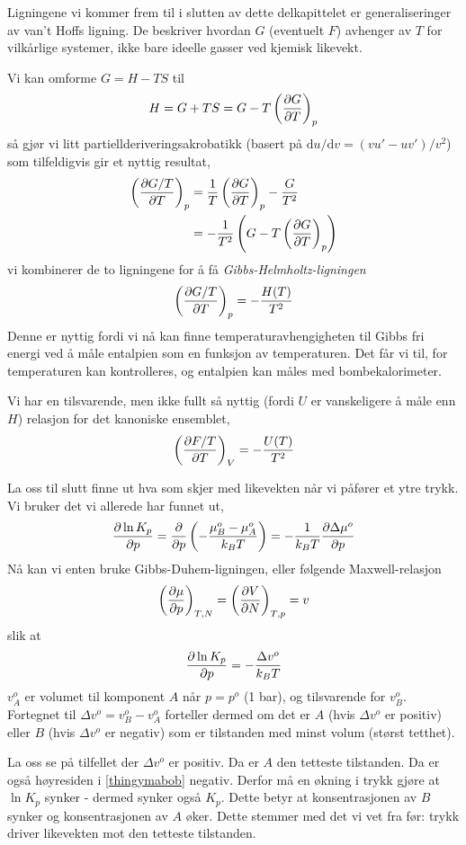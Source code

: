 Ligningene vi kommer frem til i slutten av dette delkapittelet er generaliseringer av van't Hoffs ligning. De beskriver hvordan $G$ (eventuelt $F$) avhenger av $T$ for vilkårlige systemer, ikke bare ideelle gasser ved kjemisk likevekt.

Vi kan omforme $G=H-TS$ til
\begin{equation}
	H=G+TS=G-T\left(\frac{\partial G}{\partial T}\right)_{p}
\end{equation}
så gjør vi litt partiellderiveringsakrobatikk (basert på $\text{d}u/\text{d}v=(vu'-uv')/v^2$) som tilfeldigvis gir et nyttig resultat,
\begin{align}\begin{split}
	\left(\frac{\partial G/T}{\partial T}\right)_{p}&=\frac{1}{T}\left(\frac{\partial G}{\partial T}\right)_{p}-\frac{G}{T^2}\\&=-\frac{1}{T^2}\left(G-T\left(\frac{\partial G}{\partial T}\right)_{p}\right)
\end{split}\end{align}
vi kombinerer de to ligningene for å få \emph{Gibbs-Helmholtz-ligningen}
\begin{equation}
	\left(\frac{\partial G/T}{\partial T}\right)_{p}=-\frac{H(T)}{T^2}
\end{equation}
Denne er nyttig fordi vi nå kan finne temperaturavhengigheten til Gibbs fri energi ved å måle entalpien som en funksjon av temperaturen. Det får vi til, for temperaturen kan kontrolleres, og entalpien kan måles med bombekalorimeter.

Vi har en tilsvarende, men ikke fullt så nyttig (fordi $U$ er vanskeligere å måle enn $H$) relasjon for det kanoniske ensemblet,
\begin{equation}
	\left(\frac{\partial F/T}{\partial T}\right)_{V}=-\frac{U(T)}{T^2}
\end{equation}

La oss til slutt finne ut hva som skjer med likevekten når vi påfører et ytre trykk. Vi bruker det vi allerede har funnet ut,
\begin{equation}
	\frac{\partial \ln K_p}{\partial p}=\frac{\partial }{\partial p}\left(-\frac{\mu_B^o-\mu_A^o}{k_BT}\right)=-\frac{1}{k_BT}\frac{\partial \Delta \mu^o}{\partial p}
\end{equation}
Nå kan vi enten bruke Gibbs-Duhem-ligningen, eller følgende Maxwell-relasjon
\begin{equation}
	\left(\frac{\partial \mu}{\partial p}\right)_{T,N}=\left(\frac{\partial V}{\partial N}\right)_{T,p}=v
\end{equation}
slik at
\begin{equation}
	\label{thingymabob}
	\frac{\partial \ln K_p}{\partial p}=-\frac{\Delta v^o}{k_BT}
\end{equation}
$v_A^o$ er volumet til komponent $A$ når $p=p^o$ (1 bar), og tilsvarende for $v_B^o$. Fortegnet til $\Delta v^o=v_B^o-v_A^o$ forteller dermed om det er $A$ (hvis $\Delta v^o$ er positiv) eller $B$ (hvis $\Delta v^o$ er negativ) som er tilstanden med minst volum (størst tetthet). 

La oss se på tilfellet der $\Delta v^o$ er positiv. Da er $A$ den tetteste tilstanden. Da er også høyresiden i \eqref{thingymabob} negativ. Derfor må en økning i trykk gjøre at $\ln K_p$ synker - dermed synker også $K_p$. Dette betyr at konsentrasjonen av $B$ synker og konsentrasjonen av $A$ øker. Dette stemmer med det vi vet fra før: trykk driver likevekten mot den tetteste tilstanden.
